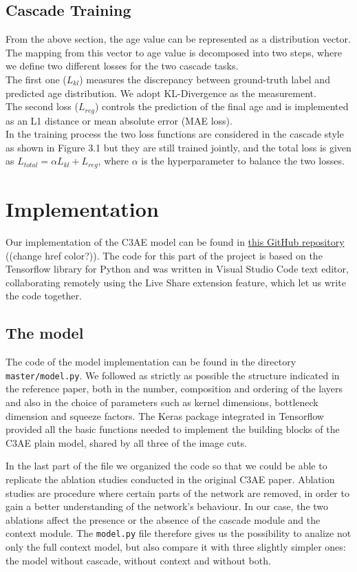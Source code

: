 \subsection*{Cascade Training}
From the above section, the age value can be represented as a distribution vector. The mapping from this 
vector to age value is decomposed into two steps, where we define two different losses for the two cascade 
tasks.\\
The first one ($L_{kl}$) measures the discrepancy between ground-truth label and predicted age distribution.
We adopt KL-Divergence as the measurement.\\
The second loss ($L_{reg}$) controls the prediction of the final age and is implemented as an L1 distance
or mean absolute error (MAE loss).\\
In the training process the two loss functions are considered in the cascade style as shown in Figure 3.1 
but they are still trained jointly, and the total loss is given as
$L_{total} = \alpha L_{kl} + L_{reg}$, where $\alpha$ is the hyperparameter to balance the two losses.

\section{Implementation}
Our implementation of the C3AE model can be found in 
\href{https://github.com/torchipeppo/NN-project}{this GitHub repository} ((change href color?)).
The code for this part of the project is based on the Tensorflow library for Python and was written in 
Visual Studio Code text editor, collaborating remotely using the Live Share extension feature, which let 
us write the code together.
\subsection*{The model}
The code of the model implementation can be found in the directory \texttt{master/model.py}. We followed 
as strictly as possible the structure indicated in the reference paper, both in the number, composition 
and ordering of the layers and also in the choice of parameters such as kernel dimensions, bottleneck
dimension and squeeze factors.
The Keras package integrated in Tensorflow provided all the basic functions needed to implement the
building blocks of the C3AE plain model, shared by all three of the image cuts.


In the last part of the file we organized the code so that we could be able to replicate the ablation
studies conducted in the original C3AE paper. Ablation studies are procedure where certain parts of the 
network are removed, in order to gain a better understanding of the network’s behaviour. In our case, 
the two ablations affect the presence or the absence of the cascade module and the context module.
The \texttt{model.py} file therefore gives us the possibility to analize not only the full context 
model, but also compare it with three slightly simpler ones: the model without cascade, without context 
and without both.

